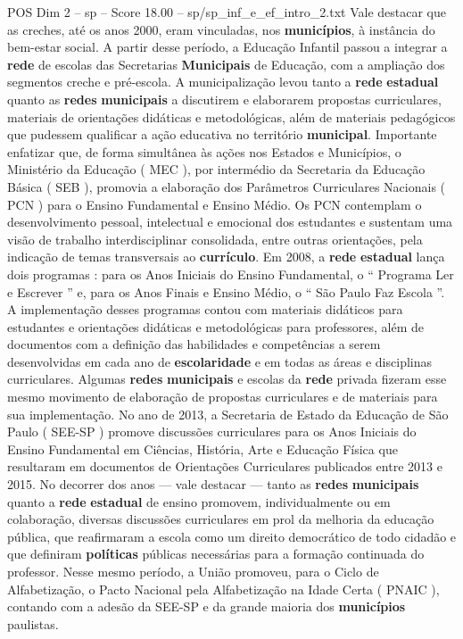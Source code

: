 \begin{textsample}{POS Dim 2 – sp – Score 18.00 – sp/sp\_inf\_e\_ef\_intro\_2.txt}
Vale destacar que as creches, até os anos 2000, eram vinculadas, nos \textbf{municípios}, à instância do bem-estar social.
A partir desse período, a Educação Infantil passou a integrar a \textbf{rede} de escolas das Secretarias \textbf{Municipais} de Educação, com a ampliação dos segmentos creche e pré-escola.
A municipalização levou tanto a \textbf{rede} \textbf{estadual} quanto as \textbf{redes} \textbf{municipais} a discutirem e elaborarem propostas curriculares, materiais de orientações didáticas e metodológicas, além de materiais pedagógicos que pudessem qualificar a ação educativa no território \textbf{municipal}.
Importante enfatizar que, de forma simultânea às ações nos Estados e Municípios, o Ministério da Educação ( MEC ), por intermédio da Secretaria da Educação Básica ( SEB ), promovia a elaboração dos Parâmetros Curriculares Nacionais ( PCN ) para o Ensino Fundamental e Ensino Médio.
Os PCN contemplam o desenvolvimento pessoal, intelectual e emocional dos estudantes e sustentam uma visão de trabalho interdisciplinar consolidada, entre outras orientações, pela indicação de temas transversais ao \textbf{currículo}.
Em 2008, a \textbf{rede} \textbf{estadual} lança dois programas : para os Anos Iniciais do Ensino Fundamental, o “ Programa Ler e Escrever ” e, para os Anos Finais e Ensino Médio, o “ São Paulo Faz Escola ”.
A implementação desses programas contou com materiais didáticos para estudantes e orientações didáticas e metodológicas para professores, além de documentos com a definição das habilidades e competências a serem desenvolvidas em cada ano de \textbf{escolaridade} e em todas as áreas e disciplinas curriculares.
Algumas \textbf{redes} \textbf{municipais} e escolas da \textbf{rede} privada fizeram esse mesmo movimento de elaboração de propostas curriculares e de materiais para sua implementação.
No ano de 2013, a Secretaria de Estado da Educação de São Paulo ( SEE-SP ) promove discussões curriculares para os Anos Iniciais do Ensino Fundamental em Ciências, História, Arte e Educação Física que resultaram em documentos de Orientações Curriculares publicados entre 2013 e 2015.
No decorrer dos anos — vale destacar — tanto as \textbf{redes} \textbf{municipais} quanto a \textbf{rede} \textbf{estadual} de ensino promovem, individualmente ou em colaboração, diversas discussões curriculares em prol da melhoria da educação pública, que reafirmaram a escola como um direito democrático de todo cidadão e que definiram \textbf{políticas} públicas necessárias para a formação continuada do professor.
Nesse mesmo período, a União promoveu, para o Ciclo de Alfabetização, o Pacto Nacional pela Alfabetização na Idade Certa ( PNAIC ), contando com a adesão da SEE-SP e da grande maioria dos \textbf{municípios} paulistas.

\end{textsample}
